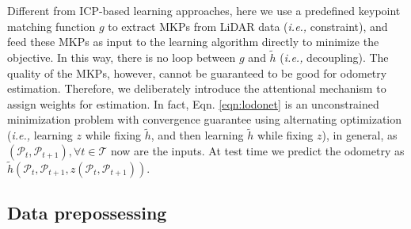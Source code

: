 \documentclass[sigconf]{acmart}
\def\ie{\emph{i.e., }}
\def\lidar{LiDAR}
\begin{document}
Different from ICP-based learning approaches, here we use a predefined keypoint matching function $g$ to extract MKPs from \lidar{} data (\ie constraint), and feed these MKPs as input to the learning algorithm directly to minimize the objective. In this way, there is no loop between $g$ and $\tilde{h}$ (\ie decoupling). The quality of the MKPs, however, cannot be guaranteed to be good for odometry estimation. Therefore, we deliberately introduce the attentional mechanism to assign weights for estimation. In fact, Eqn. \ref{eqn:lodonet} is an unconstrained minimization problem with convergence guarantee using alternating optimization (\ie learning $z$ while fixing $\tilde{h}$, and then learning $\tilde{h}$ while fixing $z$), in general, as $(\mathcal{P}_t, \mathcal{P}_{t+1}), \forall t\in\mathcal{T}$ now are the inputs. At test time we predict the odometry as $\tilde{h}(\mathcal{P}_{t}, \mathcal{P}_{t+1}, z(\mathcal{P}_{t}, \mathcal{P}_{t+1}))$.

\subsection{Data prepossessing}
\label{section:Data prepossessing}

\end{document}

